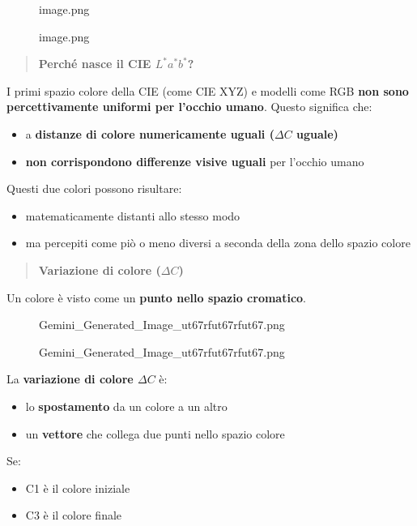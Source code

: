 \documentclass[
]{article}
\providecommand{\tightlist}{%
  \setlength{\itemsep}{0pt}\setlength{\parskip}{0pt}}
\begin{document}
\begin{figure}
\centering
{image.png}
\caption{image.png}
\end{figure}

\begin{quote}
\textbf{Perché nasce il CIE \(L^* a^* b^*\)?}
\end{quote}

I primi spazio colore della CIE (come CIE XYZ) e modelli come RGB \textbf{non sono percettivamente uniformi per l'occhio umano}.
Questo significa che:

\begin{itemize}
\tightlist
\item
  a \textbf{distanze di colore numericamente uguali (\(\Delta C\) uguale)}
\item
  \textbf{non corrispondono differenze visive uguali} per l'occhio umano
\end{itemize}

Questi due colori possono risultare:

\begin{itemize}
\tightlist
\item
  matematicamente distanti allo stesso modo
\item
  ma percepiti come piò o meno diversi a seconda della zona dello spazio colore
\end{itemize}

\begin{quote}
\textbf{Variazione di colore (\(\Delta C\))}
\end{quote}

Un colore è visto come un \textbf{punto nello spazio cromatico}.

\begin{figure}
\centering
{Gemini\_Generated\_Image\_ut67rfut67rfut67.png}
\caption{Gemini\_Generated\_Image\_ut67rfut67rfut67.png}
\end{figure}

La \textbf{variazione di colore \(\Delta C\)} è:

\begin{itemize}
\tightlist
\item
  lo \textbf{spostamento} da un colore a un altro
\item
  un \textbf{vettore} che collega due punti nello spazio colore
\end{itemize}

Se:

\begin{itemize}
\tightlist
\item
  C1 è il colore iniziale
\item
  C3 è il colore finale
\end{itemize}
\end{document}
